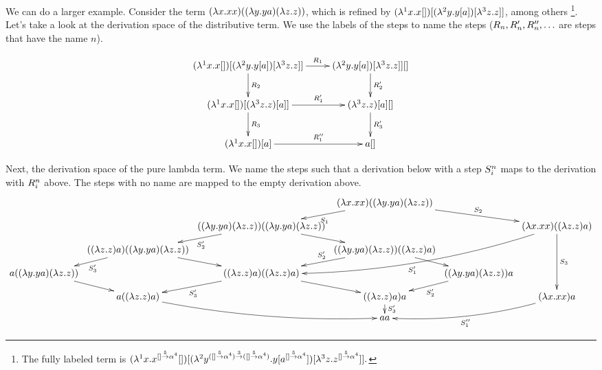 \begin{example}
We can do a larger example. Consider the term
$(\lambda x. x x) ((\lambda y. y a) (\lambda z. z))$,
which is refined by
$(\lambda^{1} x. x []) [(\lambda^{2} y. y [a]) [\lambda^{3} z. z]]$, among others
\footnote{
The fully labeled term is
$
  (\lambda^{1} x. x^{[] \overset{5}{\to} \alpha^4} [])
    [(\lambda^{2} 
      y^{([] \overset{5}{\to} \alpha^4) \overset{3}{\to} ([] \overset{5}{\to} \alpha^4)}
      . y [a^{[] \overset{5}{\to} \alpha^4}])
        [\lambda^{3} z. z^{[] \overset{5}{\to} \alpha^4}]
    ].
$
}.
Let's take a look at the derivation space of the distributive term. We use the labels of the
steps to name the steps ($R_n, R_n', R_n'', \hdots$ are steps that have the name $n$).

\[
  \xymatrix{
  (\lamp{1}{\var}{\var []}) [(\lamp{2}{\vartwo}{\vartwo [a]}) [\lamp{3}{\varthree}{\varthree}]]
  \ar[r]^-{\redex_1}
  \ar[d]^-{\redex_2}
  &
  (\lamp{2}{\vartwo}{\vartwo [a]}) [\lamp{3}{\varthree}{\varthree}]] []
  \ar[d]^-{\redex_2'}
  \\
  (\lamp{1}{\var}{\var []}) [(\lamp{3}{\varthree}{\varthree}) [a]]
  \ar[r]^-{\redex_1'}
  \ar[d]^-{\redex_3}
  &
  (\lamp{3}{\varthree}{\varthree}) [a] []
  \ar[d]^-{\redex_3'}
  \\
  (\lamp{1}{\var}{\var []}) [a]
  \ar[r]^-{\redex_1''}
  &
  a []
  }
\]

Next, the derivation space of the pure lambda term.
We name the steps such that a derivation below with a step $S_i^n$ maps to
the derivation with $R_i^n$ above. The steps with no name are mapped to the empty
derivation above.
{\tiny
\[
\xymatrix@R=.3cm@C=.1cm{
  &
  &
  & (\lam{\var}{\var \var})((\lam{\vartwo}{\vartwo a}) (\lam{\varthree}{\varthree}))
  \ar[dl]^-{\redextwo_1}
  \ar[drr]^-{\redextwo_2}
  &
  &
  \\
  &
  & ((\lam{\vartwo}{\vartwo a}) (\lam{\varthree}{\varthree})) ((\lam{\vartwo}{\vartwo a}) (\lam{\varthree}{\varthree}))
  \ar[dl]^-{\redextwo_2'}
  \ar[dr]
  &
  &
  & (\lam{\var}{\var \var}) ((\lam{\varthree}{\varthree}) a)
  \ar[ddd]^-{\redextwo_3}
  \ar@/^.5cm/[ddlll]^{\redextwo_1'}
  \\
  & ((\lam{\varthree}{\varthree}) a) ((\lam{\vartwo}{\vartwo a}) (\lam{\varthree}{\varthree}))
  \ar[dl]^-{\redextwo_3'}
  \ar[dr]
  &
  & ((\lam{\vartwo}{\vartwo a}) (\lam{\varthree}{\varthree})) ((\lam{\varthree}{\varthree}) a)
  \ar[dl]_-{\redextwo_2'}
  \ar[dr]
  &
  &
  \\
  a ((\lam{\vartwo}{\vartwo a}) (\lam{\varthree}{\varthree}))
  \ar[dr]
  &
  & ((\lam{\varthree}{\varthree}) a) ((\lam{\varthree}{\varthree}) a)
  \ar[dl]^-{\redextwo_3'}
  \ar[dr]
  &
  & ((\lam{\vartwo}{\vartwo a}) (\lam{\varthree}{\varthree})) a
  \ar[dl]^-{\redextwo_2'}
  &
  \\
  & a ((\lam{\varthree}{\varthree}) a)
  \ar@/_.3cm/[drr]
  &
  & ((\lam{\varthree}{\varthree}) a) a
  \ar[d]^-{\redextwo_3'}
  &
  & (\lam{\var}{\var \var}) a
  \ar@/^.3cm/[dll]^-{\redextwo_1''}
  \\
  &
  &
  & a a
  &
  &
  \\
}
\]
}


\end{example}
